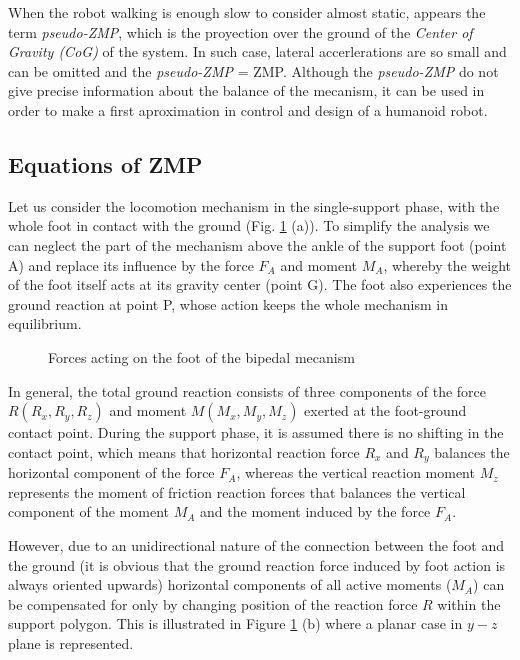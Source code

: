 When the robot walking is enough slow to consider almost static, appears the term \textit{pseudo-ZMP}, which is the proyection over the ground of the \textit{Center of Gravity (CoG)} of the system. In such case, lateral accerlerations are so small and can be omitted and the \textit{pseudo-ZMP} = ZMP. Although the \textit{pseudo-ZMP} do not give precise information about the balance of the mecanism, it can be used in order to make a first aproximation in control and design of a humanoid robot.



\subsection{Equations of ZMP}
Let us consider the locomotion mechanism in the single-support phase, with the whole foot in contact with the ground (Fig. \ref{fig:pie} (a)). To simplify the analysis we can neglect the part of the mechanism above the ankle of the support foot (point A) and replace its influence by the force $F_A$ and moment $M_A$, whereby the weight of the foot itself acts at its gravity center (point G). The foot also experiences the ground reaction at point P, whose action keeps the whole mechanism in equilibrium.

\begin{figure}[!hbt]
\centering
{}
\caption{Forces acting on the foot of the bipedal mecanism \protect\cite{Vuk2004} }
\label{fig:pie}
\end{figure}

In general, the total ground reaction consists of three components of the force $R (R_x, R_y, R_z)$ and moment $M (M_x, M_y, M_z)$ exerted at the foot-ground contact point. During the support phase, it is assumed there is no shifting in the contact point, which means that horizontal reaction force $R_x$ and $R_y$ balances the horizontal component of the force $F_A$, whereas the vertical reaction moment $M_z$ represents the moment of friction reaction forces that balances the vertical component of the moment $M_A$ and the moment induced by the force $F_A$.

However, due to an unidirectional nature of the connection between the foot and the ground (it is obvious that the ground reaction force induced by foot action is always oriented upwards) horizontal components of all active moments ($M_A$) can be compensated for only by changing position of the reaction force $R$ within the support polygon. This is illustrated in Figure \ref{fig:pie} (b) where a planar case in $y-z$ plane is represented.

